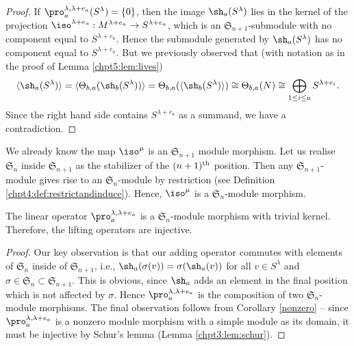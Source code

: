 \documentclass[11pt]{report}
\begin{document}
\begin{proof}
	If $\pro^{\lambda,\lambda+e_{a}}_{a}(S^\lambda) = \{0\}$, then the image 
	$\sh_a(S^\lambda)$ 
	lies in the kernel of the projection 
	$\iso^{\lambda+e_a}:M^{\lambda+e_a}\to S^{\lambda+e_a}$,
	which is an $\mathfrak{S}_{n+1}$-submodule with no component equal to 
	$S^{\lambda+e_a}$.
	Hence the submodule generated by $\sh_a(S^\lambda)$ has no component 
	equal to $S^{\lambda+e_a}$.
	But we previously observed that (with notation as in the proof of Lemma 
	\ref{chpt5:lem:lives})
	\[\langle \sh_{a}(S^{\lambda}) \rangle =  \langle\Theta_{b,a}( 
	\sh_{b}(S^{\lambda}))\rangle=\Theta_{b,a}( 
	\langle\sh_{b}(S^{\lambda})\rangle ) \cong \Theta_{b,a}(N) 
	\cong \bigoplus_{1\leq i \leq a} S^{\lambda + e_{i}}.\]
	Since the right hand side contains $S^{\lambda+e_a}$ as a summand, we 
	have a contradiction.
\end{proof}


We already know the map $\iso^{\mu}$ is an $\mathfrak{S}_{n+1}$ module 
morphism. Let us realise $\mathfrak{S}_{n}$ inside $\mathfrak{S}_{n+1}$ as 
the stabilizer of the $(n+1)^{\rm th}$ position.
Then any $\mathfrak{S}_{n+1}$-module gives rise to an 
$\mathfrak{S}_n$-module by restriction (see Definition \ref{chpt4:def:restrictandinduce}). Hence, $\iso^{\mu}$ is a $\mathfrak{S}_{n}$-module morphism.




\begin{lemma}
	\label{modulemorph}
	The linear operator $\pro_{a}^{\lambda,\lambda+e_{a}}$ is a 
	$\mathfrak{S}_{n}$-module morphism with trivial kernel. Therefore, the lifting operators are injective.
	
	
	
\end{lemma}

\begin{proof}
	Our key observation is that our adding operator commutes with elements of $\mathfrak{S}_{n}$ inside of $\mathfrak{S}_{n+1}$, i.e., $\sh_a(\sigma(v)) = \sigma(\sh_a(v))$ for 
	all $v \in S^{\lambda}$ and $\sigma \in 
	\mathfrak{S}_{n} \subset \mathfrak{S}_{n+1}$. 
	This is obvious, since $\sh_a$ adds an element in the final position 
	which is not affected by $\sigma$. 
	Hence $\pro_a^{\lambda,\lambda+e_a}$ is the composition of two 
	$\mathfrak{S}_n$-module morphisms.
	The final observation follows from Corollary \ref{nonzero} -- since 
	$\pro_a^{\lambda,\lambda+e_a}$
	is a nonzero module morphism with a simple module as its domain, it 
	must be injective by Schur's lemma (Lemma \ref{chpt3:lem:schur}).
\end{proof}
\end{document}
